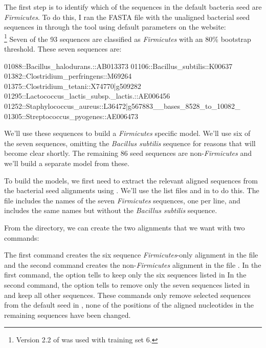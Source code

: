 The first step is to identify which of the sequences in the default
bacteria seed are \emph{Firmicutes}. To do this, I ran the FASTA file
with the unaligned bacterial seed sequences in
 through the  tool
using default parameters \cite{Wang07} on the  website: \\
\footnote{Version
  2.2 of  was used with  training set 6.}
Seven of the 93 sequences are classified as \emph{Firmicutes} with an
80\% bootstrap threshold. These seven sequences are:
\begin{sreoutput}
01088::Bacillus_halodurans.::AB013373
01106::Bacillus_subtilis::K00637
01382::Clostridium_perfringens::M69264
01375::Clostridium_tetani::X74770|g509282
01295::Lactococcus_lactis_subsp._lactis.::AE006456
01252::Staphylococcus_aureus::L36472|g567883__bases_8528_to_10082_
01305::Streptococcus_pyogenes::AE006473
\end{sreoutput}

We'll use these sequences to build a \emph{Firmicutes} specific model. 
We'll use six of the seven sequences, omitting the \emph{Bacillus subtilis}
sequence for reasons that will become clear shortly.
The remaining 86 seed sequences are non-\emph{Firmicutes} and we'll build 
a separate model from these. 

To build the models, we first need to extract the relevant aligned sequences
from the bacterial seed alignments using . We'll use
the list files  and  in
 to do this. The  file
includes the names of the seven \emph{Firmicutes} sequences, one per
line, and  includes the same names but without the
\emph{Bacillus subtilis} sequence. 

From the  directory, we can create the two alignments
that we want with two commands:



The first command creates the six sequence \emph{Firmicutes}-only
alignment in the file \\  and the
second command creates the non-\emph{Firmicutes}
alignment in the file . 
In the first command, the  option tells 
to keep only the six sequences listed in  In the
second command, the  option tells  to
remove only the seven sequences listed in  and keep
all other sequences.  These commands only remove selected sequences
from the default seed in , none of
the positions of the aligned nucleotides in the remaining sequences
have been changed.

